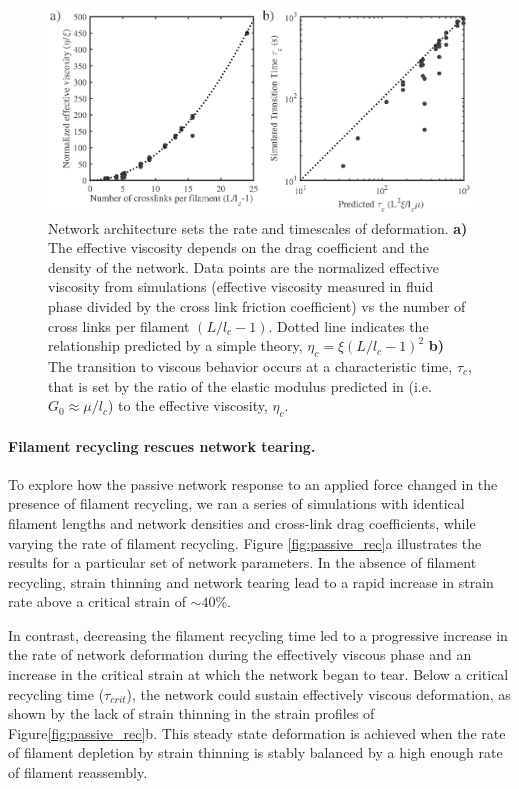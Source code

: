 \documentclass[10pt,letterpaper]{article}
\begin{document}
\begin{figure}[h!]
\centering
\includegraphics[width=\hsize]{figures/figure3b}
\caption{\label{fig:passive_form} Network architecture sets the rate and timescales of deformation. \textbf{a)} The effective viscosity depends on the drag coefficient and the density of the network. Data points are the normalized effective viscosity from simulations (effective viscosity measured in fluid phase divided by the cross link friction coefficient) vs the number of cross links per filament $(L/l_c - 1)$.  Dotted line indicates the relationship predicted by a simple theory, $\eta_c = \xi(L/l_c-1)^2$ \textbf{b)} The transition to viscous behavior occurs at a characteristic time, $\tau_c$, that is set by the ratio of the elastic modulus predicted in \cite{theo_hlm} (i.e. $G_0 \approx \mu/l_c$) to the effective viscosity, $\eta_c$.  }
\end{figure}


\paragraph{Filament recycling rescues network tearing.}  To explore how the passive network response to an applied force changed in the presence of filament recycling, we ran a series of simulations with identical filament lengths and network densities and cross-link drag coefficients, while varying the rate of filament recycling. Figure \ref{fig:passive_rec}a illustrates the results for a particular set of network parameters.  In the absence of filament recycling, strain thinning and network tearing lead to a rapid increase in strain rate above a critical strain of $\sim40\%$. 

In contrast, decreasing the filament recycling time led to a progressive increase in the rate of network deformation during the effectively viscous phase and an increase in the critical strain at which the network began to tear. Below a critical recycling time ($\tau_{crit}$), the network could sustain effectively viscous deformation, as shown by the lack of strain thinning in the strain profiles of Figure\ref{fig:passive_rec}b.  This steady state deformation is achieved when the rate of filament depletion by strain thinning is stably balanced by a high enough rate of filament reassembly. 
\end{document}

